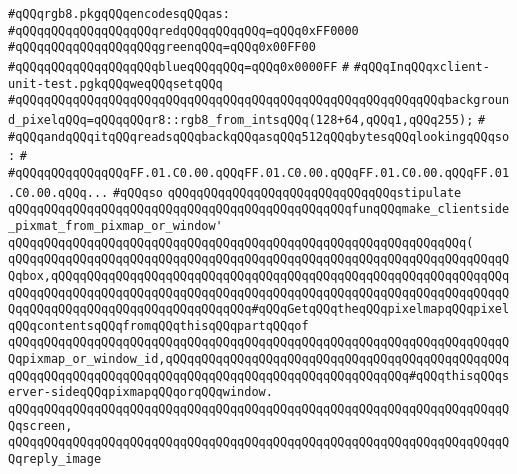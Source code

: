 \newline
\newline
\verb|#qQQqrgb8.pkgqQQqencodesqQQqas:|\newline
\verb|#qQQqqQQqqQQqqQQqqQQqredqQQqqQQqqQQq=qQQq0xFF0000|\newline
\verb|#qQQqqQQqqQQqqQQqqQQqgreenqQQq=qQQq0x00FF00|\newline
\verb|#qQQqqQQqqQQqqQQqqQQqblueqQQqqQQq=qQQq0x0000FF|\newline
\verb|#|\newline
\verb|#qQQqInqQQqxclient-unit-test.pgkqQQqweqQQqsetqQQq|\newline
\verb|#qQQqqQQqqQQqqQQqqQQqqQQqqQQqqQQqqQQqqQQqqQQqqQQqqQQqqQQqqQQqbackground_pixelqQQq=qQQqqQQqr8::rgb8_from_intsqQQq(128+64,qQQq1,qQQq255);|\newline
\verb|#|\newline
\verb|#qQQqandqQQqitqQQqreadsqQQqbackqQQqasqQQq512qQQqbytesqQQqlookingqQQqso:|\newline
\verb|#|\newline
\verb|#qQQqqQQqqQQqqQQqFF.01.C0.00.qQQqFF.01.C0.00.qQQqFF.01.C0.00.qQQqFF.01.C0.00.qQQq...|\newline
\verb|#qQQqso|\newline
\newline
\verb|qQQqqQQqqQQqqQQqqQQqqQQqqQQqqQQqstipulate|\newline
\newline
\verb|qQQqqQQqqQQqqQQqqQQqqQQqqQQqqQQqqQQqqQQqqQQqqQQqfunqQQqmake_clientside_pixmat_from_pixmap_or_window'|\newline
\verb|qQQqqQQqqQQqqQQqqQQqqQQqqQQqqQQqqQQqqQQqqQQqqQQqqQQqqQQqqQQqqQQq(|\newline
\verb|qQQqqQQqqQQqqQQqqQQqqQQqqQQqqQQqqQQqqQQqqQQqqQQqqQQqqQQqqQQqqQQqqQQqqQQqbox,qQQqqQQqqQQqqQQqqQQqqQQqqQQqqQQqqQQqqQQqqQQqqQQqqQQqqQQqqQQqqQQqqQQqqQQqqQQqqQQqqQQqqQQqqQQqqQQqqQQqqQQqqQQqqQQqqQQqqQQqqQQqqQQqqQQqqQQqqQQqqQQqqQQqqQQqqQQqqQQqqQQqqQQq#qQQqGetqQQqtheqQQqpixelmapqQQqpixelqQQqcontentsqQQqfromqQQqthisqQQqpartqQQqof|\newline
\verb|qQQqqQQqqQQqqQQqqQQqqQQqqQQqqQQqqQQqqQQqqQQqqQQqqQQqqQQqqQQqqQQqqQQqqQQqpixmap_or_window_id,qQQqqQQqqQQqqQQqqQQqqQQqqQQqqQQqqQQqqQQqqQQqqQQqqQQqqQQqqQQqqQQqqQQqqQQqqQQqqQQqqQQqqQQqqQQqqQQqqQQqqQQq#qQQqthisqQQqserver-sideqQQqpixmapqQQqorqQQqwindow.|\newline
\verb|qQQqqQQqqQQqqQQqqQQqqQQqqQQqqQQqqQQqqQQqqQQqqQQqqQQqqQQqqQQqqQQqqQQqqQQqscreen,|\newline
\verb|qQQqqQQqqQQqqQQqqQQqqQQqqQQqqQQqqQQqqQQqqQQqqQQqqQQqqQQqqQQqqQQqqQQqqQQqreply_image|\newline
